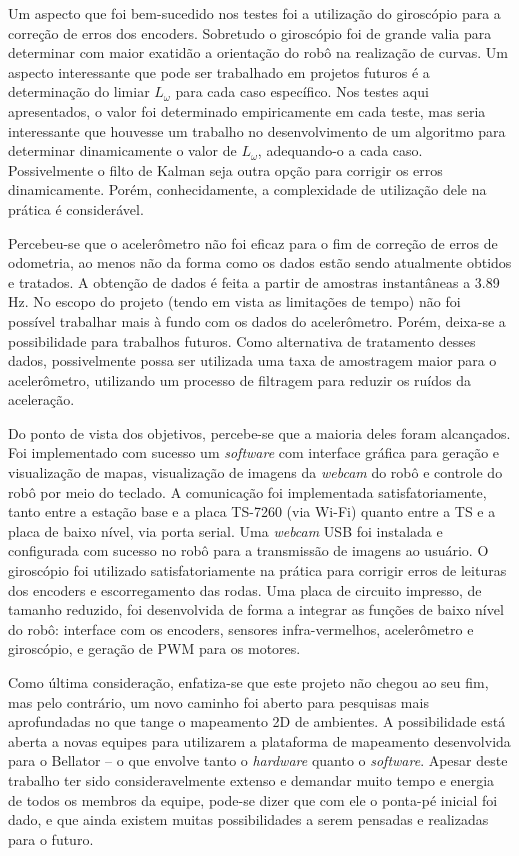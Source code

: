 Um aspecto que foi bem-sucedido nos testes foi a utilização do giroscópio para a correção de erros dos encoders. Sobretudo o giroscópio foi de grande valia para determinar com maior exatidão a orientação do robô na realização de curvas. Um aspecto interessante que pode ser trabalhado em projetos futuros é a determinação do limiar $L_\omega$ para cada caso específico. Nos testes aqui apresentados, o valor foi determinado empiricamente em cada teste, mas seria interessante que houvesse um trabalho no desenvolvimento de um algoritmo para determinar dinamicamente o valor de $L_\omega$, adequando-o a cada caso. Possivelmente o filto de Kalman seja outra opção para corrigir os erros dinamicamente. Porém, conhecidamente, a complexidade de utilização dele na prática é considerável.

Percebeu-se que o acelerômetro não foi eficaz para o fim de correção de erros de odometria, ao menos não da forma como os dados estão sendo atualmente obtidos e tratados. A obtenção de dados é feita a partir de amostras instantâneas a 3.89 Hz. No escopo do projeto (tendo em vista as limitações de tempo) não foi possível trabalhar mais à fundo com os dados do acelerômetro. Porém, deixa-se a possibilidade para trabalhos futuros. Como alternativa de tratamento desses dados, possivelmente possa ser utilizada uma taxa de amostragem maior para o acelerômetro, utilizando um processo de filtragem para reduzir os ruídos da aceleração.

Do ponto de vista dos objetivos, percebe-se que a maioria deles foram alcançados. Foi implementado com sucesso um \textit{software} com interface gráfica para geração e visualização de mapas, visualização de imagens da \textit{webcam} do robô e controle do robô por meio do teclado. A comunicação foi implementada satisfatoriamente, tanto entre a estação base e a placa TS-7260 (via Wi-Fi) quanto entre a TS e a placa de baixo nível, via porta serial. Uma \textit{webcam} USB foi instalada e configurada com sucesso no robô para a transmissão de imagens ao usuário. O giroscópio foi utilizado satisfatoriamente na prática para corrigir erros de leituras dos encoders e escorregamento das rodas. Uma placa de circuito impresso, de tamanho reduzido, foi desenvolvida de forma a integrar as funções de baixo nível do robô: interface com os encoders, sensores infra-vermelhos, acelerômetro e giroscópio, e geração de PWM para os motores.

Como última consideração, enfatiza-se que este projeto não chegou ao seu fim, mas pelo contrário, um novo caminho foi aberto para pesquisas mais aprofundadas no que tange o mapeamento 2D de ambientes. A possibilidade está aberta a novas equipes para utilizarem a plataforma de mapeamento desenvolvida para o Bellator -- o que envolve tanto o \textit{hardware} quanto o \textit{software}. Apesar deste trabalho ter sido consideravelmente extenso e demandar muito tempo e energia de todos os membros da equipe, pode-se dizer que com ele o ponta-pé inicial foi dado, e que ainda existem muitas possibilidades a serem pensadas e realizadas para o futuro.


